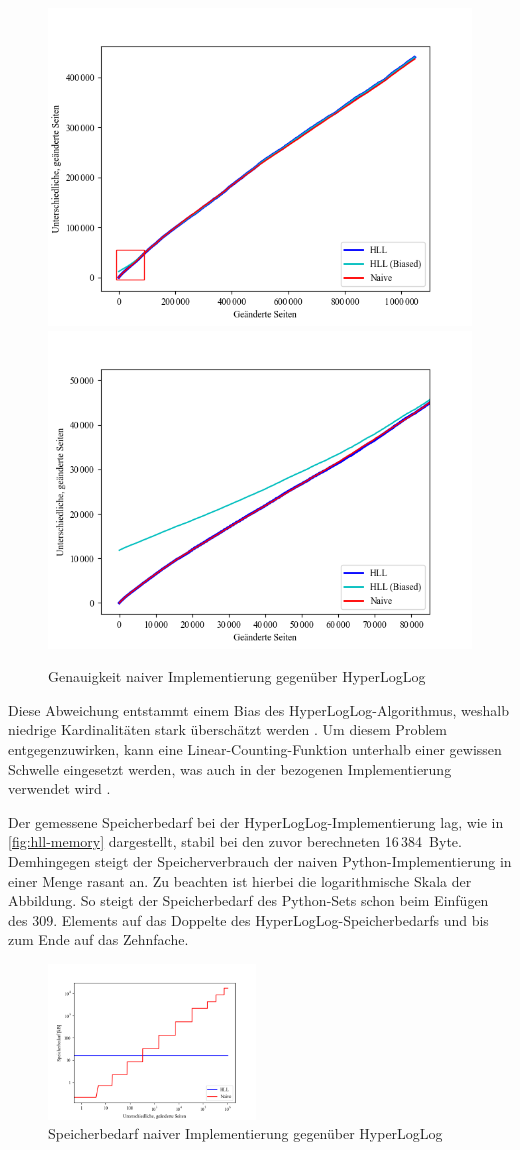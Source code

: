 \begin{figure}[t]
	\centering
	\includegraphics[width=.49\textwidth]{images/hll_count_1.png}
	\includegraphics[width=.49\textwidth]{images/hll_count_2.png}
	\caption{Genauigkeit naiver Implementierung gegenüber HyperLogLog}
	\label{fig:hll-count}
\end{figure}

Diese Abweichung entstammt einem Bias des HyperLogLog-Algorithmus, weshalb niedrige Kardinalitäten stark überschätzt werden \cite{heule2013}.
Um diesem Problem entgegenzuwirken, kann eine Linear-Counting-Funktion unterhalb einer gewissen Schwelle eingesetzt werden, was auch in der bezogenen Implementierung verwendet wird \cite{evseenko2018}.

Der gemessene Speicherbedarf bei der HyperLogLog-Implementierung lag, wie in \autoref{fig:hll-memory} dargestellt, stabil bei den zuvor berechneten 16\,384~Byte.
Demhingegen steigt der Speicherverbrauch der naiven Python-Implementierung in einer Menge rasant an.
Zu beachten ist hierbei die logarithmische Skala der Abbildung.
So steigt der Speicherbedarf des Python-Sets schon beim Einfügen des 309.
Elements auf das Doppelte des HyperLogLog-Speicherbedarfs und bis zum Ende auf das Zehnfache.

\begin{figure}[b!]
	\centering
	\includegraphics[width=0.49\textwidth]{images/hll_memory.png}
	\caption{Speicherbedarf naiver Implementierung gegenüber HyperLogLog}
	\label{fig:hll-memory}
\end{figure}

